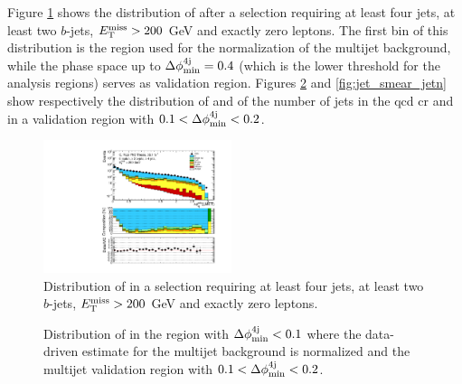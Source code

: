 Figure \ref{fig:jet_smear_dphi} shows the distribution of \dphimin after a selection requiring at least four jets, at least two $b$-jets, $E_{\rm T}^{\mathrm{miss}}>200$ GeV and exactly zero leptons. The first bin of this distribution is the region used for the normalization of the multijet background, 
while the phase space up to $\Delta\phi_{\rm{min}}^{4{\rm{j}}}=0.4$ (which is the lower threshold for the analysis regions) serves as validation region. 
Figures \ref{fig:jet_smear_met} and \ref{fig:jet_smear_jetn} show respectively the distribution of \met and of the number of jets in the \gls{qcd} \gls{cr} and in a validation region with $0.1 < \Delta\phi_{\rm{min}}^{4{\rm{j}}} < 0.2$.

\begin{figure}[h!]
\centering 
\includegraphics[width=0.49\textwidth]{figures/susy_common/jet_smearing/data_mc_dphi_min_QCD_noDphi.pdf}
\caption{Distribution of \dphimin in a selection requiring at least four jets, at least two $b$-jets, $E_{\rm T}^{\mathrm{miss}}>200$ GeV and exactly zero leptons.}\label{fig:jet_smear_dphi}
\end{figure}


\begin{figure}[h!]
\centering 
{}
\caption{Distribution of \met in  the region with $\Delta\phi_{\rm{min}}^{4{\rm{j}}} < 0.1$ where the data-driven estimate for the multijet background is normalized and  the multijet validation region with $0.1 < \Delta\phi_{\rm{min}}^{4{\rm{j}}} < 0.2$.}\label{fig:jet_smear_met}
\end{figure}

